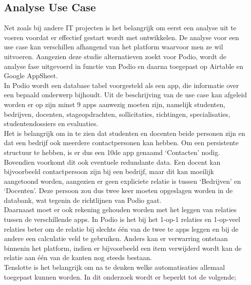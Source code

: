 \subsection{Analyse Use Case}

Net zoals bij andere IT projecten is het belangrijk om eerst een analyse uit te voeren voordat er effectief gestart wordt met ontwikkelen. De analyse voor een use case kan verschillen afhangend van het platform waarvoor men ze wil uitvoeren. Aangezien deze studie alternatieven zoekt voor Podio, wordt de analyse fase uitgevoerd in functie van Podio en daarna toegepast op Airtable en Google AppSheet. \\

In Podio wordt een database tabel voorgesteld als een app, die informatie over een bepaald onderwerp bijhoudt. Uit de beschrijving van de use case kan afgeleid worden er op zijn minst 9 apps aanwezig moeten zijn, namelijk studenten, bedrijven, docenten, stageopdrachten, sollicitaties, richtingen, specialisaties, studentendossiers en evaluaties. \\

Het is belangrijk om in te zien dat studenten en docenten beide personen zijn en dat een bedrijf ook meerdere contactpersonen kan hebben. Om een persistente structuur te hebben, is er dus een 10de app genaamd ‘Contacten’ nodig. Bovendien voorkomt dit ook eventuele redundante data. Een docent kan bijvoorbeeld contactpersoon zijn bij een bedrijf, maar dit kan moeilijk aangetoond worden, aangezien er geen expliciete relatie is tussen ‘Bedrijven’ en ‘Docenten’. Deze persoon zou dus twee keer moeten opgeslagen worden in de databank, wat tegenin de richtlijnen van Podio gaat. \\

Daarnaast moet er ook rekening gehouden worden met het leggen van relaties tussen de verschillende apps. In Podio is het bij het 1-op-1 relaties en 1-op-veel relaties beter om de relatie bij slechts één van de twee te apps leggen en bij de andere een calculatie veld te gebruiken. Anders kan er verwarring ontstaan binnenin het platform, indien er bijvoorbeeld een item verwijderd wordt kan de relatie aan één van de kanten nog steeds bestaan. \\

Tenslotte is het belangrijk om na te denken welke automatisaties allemaal toegepast kunnen worden. In dit onderzoek wordt er beperkt tot de volgende;

